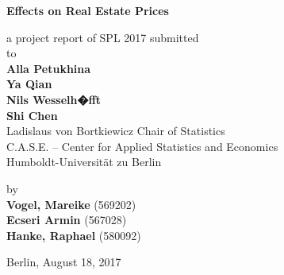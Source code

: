 \begin{center}
    {\Large{\bf Effects on Real Estate Prices}} \vspace{0.5cm}


    {\normalsize a project report of SPL 2017   submitted\\\vspace{0.5cm}
    to}\\\vspace{0.5cm}
    {\normalsize{\bf Alla Petukhina \\ Ya Qian \\ Nils Wesselh�fft \\ Shi Chen}} \\\vspace{0.5cm}
    {\normalsize Ladislaus von Bortkiewicz Chair of Statistics\\ C.A.S.E. – Center for Applied Statistics and Economics\\ Humboldt-Universität zu Berlin } \vspace{1cm}


    {\normalsize by \\\vspace{0.5cm}
    {\textbf{Vogel, Mareike} (569202)\\ \textbf{Ecseri Armin} (567028) \\ \textbf{Hanke, Raphael} (580092)} \\
    } \vspace{1cm}

    {\normalsize Berlin, August 18, 2017}

\end{center}
